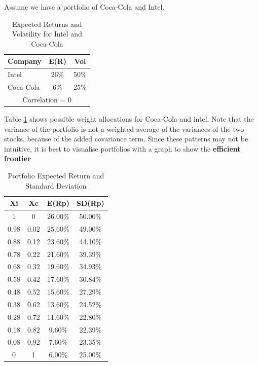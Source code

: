 Assume we have a portfolio of Coca-Cola and Intel.

\begin{table}[ht]
    \centering
    \caption{Expected Returns and Volatility for Intel and Coca-Cola}
    \label{tab:intel-coke}
    \begin{tabular}{@{}lcc@{}}
    \toprule
    \textbf{Company} & \textbf{E(R)} & \textbf{Vol} \\
    \midrule
    Intel    & 26\% & 50\% \\
    Coca-Cola & 6\%  & 25\% \\
    \midrule
    \multicolumn{3}{c}{Correlation = 0} \\
    \bottomrule
    \end{tabular}
 \end{table}

Table \ref{tab:intel-coke} shows possible weight allocations for Coca-Cola and intel. Note that the variance of the portfolio is not a weighted average of the variances of the two stocks, because of the added covariance term. Since these patterns may not be intuitive, it is best to visualise portfolios with a graph to show the \textbf{efficient frontier}


\begin{table}[ht]
    \centering
    \caption{Portfolio Expected Return and Standard Deviation}
    \begin{tabular}{@{}cccc@{}}
    \toprule
    \textbf{Xi} & \textbf{Xc} & \textbf{E(Rp)} & \textbf{SD(Rp)} \\ 
    \midrule
    1    & 0    & 26.00\% & 50.00\% \\
    0.98 & 0.02 & 25.60\% & 49.00\% \\
    0.88 & 0.12 & 23.60\% & 44.10\% \\
    0.78 & 0.22 & 21.60\% & 39.39\% \\
    0.68 & 0.32 & 19.60\% & 34.93\% \\
    0.58 & 0.42 & 17.60\% & 30.84\% \\
    0.48 & 0.52 & 15.60\% & 27.29\% \\
    0.38 & 0.62 & 13.60\% & 24.52\% \\
    0.28 & 0.72 & 11.60\% & 22.80\% \\
    0.18 & 0.82 & 9.60\%  & 22.39\% \\
    0.08 & 0.92 & 7.60\%  & 23.35\% \\
    0    & 1    & 6.00\%  & 25.00\% \\
    \bottomrule
    \end{tabular}
    \end{table}




